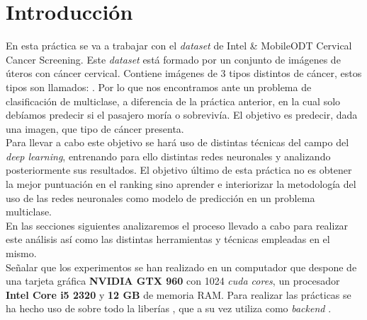 \section{Introducción}

En esta práctica se va a trabajar con el \textit{dataset} de Intel \& MobileODT Cervical Cancer Screening. Este \textit{dataset} está formado por un conjunto de imágenes de úteros con cáncer cervical. Contiene imágenes de 3 tipos distintos de cáncer, estos tipos son llamados: . Por lo que nos encontramos ante un problema de clasificación de multiclase, a diferencia de la práctica anterior, en la cual solo debíamos predecir si el pasajero moría o sobrevivía. El objetivo es predecir, dada una imagen, que tipo de cáncer presenta.\\

Para llevar a cabo este objetivo se hará uso de distintas técnicas del campo del \textit{deep learning}, entrenando para ello distintas redes neuronales y analizando posteriormente sus resultados. El objetivo último de esta práctica no es obtener la mejor puntuación en el ranking sino aprender e interiorizar la metodología del uso de las redes neuronales como modelo de predicción en un problema multiclase.\\

En las secciones siguientes analizaremos el proceso llevado a cabo para realizar este análisis así como las distintas herramientas y técnicas empleadas en el mismo.\\

Señalar que los experimentos se han realizado en un computador que despone de una tarjeta gráfica \textbf{NVIDIA GTX 960} con 1024 \textit{cuda cores}, un procesador \textbf{Intel Core i5 2320} y \textbf{12 GB} de memoria RAM. Para realizar las prácticas se ha hecho uso de  sobre todo la liberías , que a su vez utiliza como \textit{backend} .

